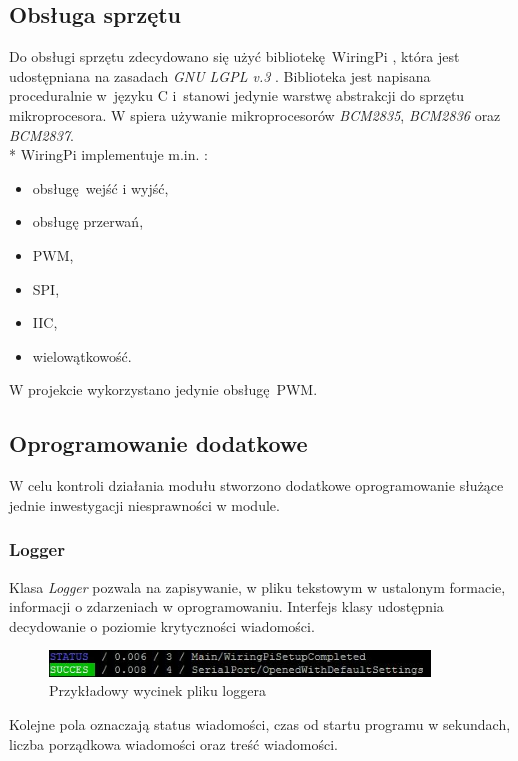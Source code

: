 \documentclass[12pt, eng, twoside, openany, final]{mgr}
\begin{document}
                \subsection{Obsługa sprzętu}
                Do obsługi sprzętu zdecydowano się użyć bibliotekę WiringPi \cite{wiringPi}, która jest udostępniana na zasadach \emph{GNU LGPL v.3 }. Biblioteka jest napisana proceduralnie w~języku C i~stanowi jedynie warstwę abstrakcji do sprzętu mikroprocesora. W spiera używanie mikroprocesorów \emph{BCM2835}, \emph{BCM2836} oraz  \emph{BCM2837}. \\*
                WiringPi implementuje m.in. : 
                \begin{itemize}
                    \item obsługę wejść i wyjść,
                    \item obsługę przerwań,
                    \item PWM,
                    \item SPI,
                    \item IIC,
                    \item wielowątkowość.
                \end{itemize}
                W projekcie wykorzystano jedynie obsługę PWM.
                
                \subsection{Oprogramowanie dodatkowe}
                W celu kontroli działania modułu stworzono dodatkowe oprogramowanie służące jednie inwestygacji niesprawności w module.
                \subsubsection{Logger}
                Klasa \emph{Logger} pozwala na zapisywanie, w pliku tekstowym w ustalonym formacie, informacji o zdarzeniach w oprogramowaniu.  Interfejs klasy udostępnia decydowanie o poziomie krytyczności wiadomości.
                    \begin{figure}[H]
                    \begin{center}
                        \includegraphics[width=0.9\textwidth]{logger.jpg}
                        \caption{Przykładowy wycinek pliku loggera}
                    \end{center}
                    \end{figure}
                \noindent Kolejne pola oznaczają status wiadomości, czas od startu programu w sekundach, liczba porządkowa wiadomości oraz treść wiadomości.
                
\end{document}
